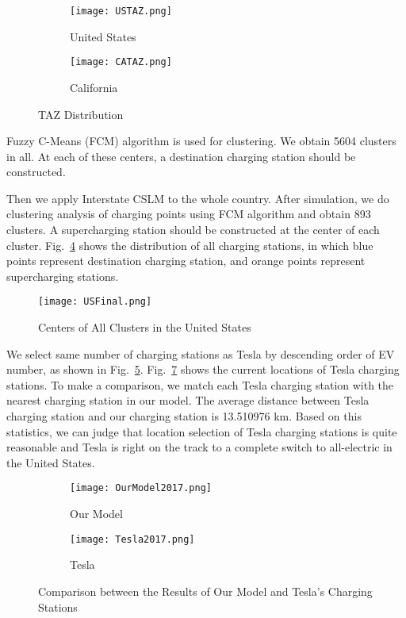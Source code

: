 \documentclass{mcmthesis}
\begin{document}
\begin{figure}[H]
    \centering
    \begin{subfigure}[b]{0.45\textwidth}
		\texttt{[image: USTAZ.png]}
		\caption{United States}
		\label{Fig-USTAZ}
	\end{subfigure}
    \begin{subfigure}[b]{0.45\textwidth}
		\texttt{[image: CATAZ.png]}
		\caption{California}
		\label{Fig-CATAZ}
	\end{subfigure}
    \caption{TAZ Distribution}
\end{figure}

Fuzzy C-Means (FCM) algorithm is used for clustering. We obtain 5604 clusters in all. At each of these centers, a destination charging station should be constructed.

Then we apply Interstate CSLM to the whole country. After simulation, we do clustering analysis of charging points using FCM algorithm and obtain 893 clusters. A supercharging station should be constructed at the center of each cluster. Fig.~\ref{Fig-USFinal} shows the distribution of all charging stations, in which blue points represent destination charging station, and orange points represent supercharging stations.

\begin{figure}[htbp]
  \centering
  \texttt{[image: USFinal.png]}
  \caption{Centers of All Clusters in the United States}\label{Fig-USFinal}
\end{figure}

We select same number of charging stations as Tesla by descending order of EV number, as shown in Fig.~\ref{Fig-OurModel2017}. Fig.~\ref{Fig-Tesla2017} shows the current locations of Tesla charging stations. To make a comparison, we match each Tesla charging station with the nearest charging station in our model. The average distance between Tesla charging station and our charging station is 13.510976 km. Based on this statistics, we can judge that location selection of Tesla charging stations is quite reasonable and Tesla is right on the track to a complete switch to all-electric in the United States.

\begin{figure}[htbp]
    \centering
    \begin{subfigure}[b]{0.45\textwidth}
		\texttt{[image: OurModel2017.png]}
		\caption{Our Model}
		\label{Fig-OurModel2017}
	\end{subfigure}
    \begin{subfigure}[b]{0.45\textwidth}
		\texttt{[image: Tesla2017.png]}
		\caption{Tesla}
		\label{Fig-Tesla2017}
	\end{subfigure}
    \caption{Comparison between the Results of Our Model and Tesla's Charging Stations}
\end{figure}
\end{document}
